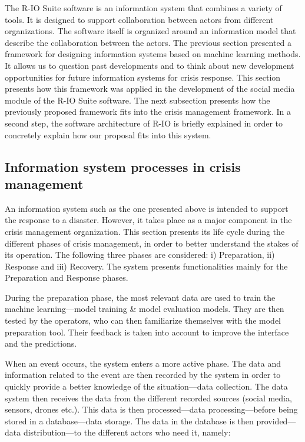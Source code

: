 The R-IO Suite software is an information system that combines a variety of tools.
It is designed to support collaboration between actors from different organizations.
The software itself is organized around an information model that describe the collaboration between the actors.
The previous section presented a framework for designing information systems based on machine learning methods.
It allows us to question past developments and to think about new development opportunities for future information systems for crisis response.
This section presents how this framework was applied in the development of the social media module of the R-IO Suite software.
The next subsection presents how the previously proposed framework fits into the crisis management framework.
In a second step, the software architecture of R-IO is briefly explained in order to concretely explain how our proposal fits into this system.

\subsection{Information system processes in crisis management}
An information system such as the one presented above is intended to support the response to a disaster.
However, it takes place as a major component in the crisis management organization.
This section presents its life cycle during the different phases of crisis management, in order to better understand the stakes of its operation.
The following three phases are considered: i) Preparation, ii) Response and iii) Recovery.
The system presents functionalities mainly for the Preparation and Response phases.

During the preparation phase, the most relevant data are used to train the machine learning—model training \& model evaluation models.
They are then tested by the operators, who can then familiarize themselves with the model preparation tool.
Their feedback is taken into account to improve the interface and the predictions.

When an event occurs, the system enters a more active phase.
The data and information related to the event are then recorded by the system in order to quickly provide a better knowledge of the situation—data collection.
The data system then receives the data from the different recorded sources (social media, sensors, drones etc.).
This data is then processed—data processing—before being stored in a database—data storage.
The data in the database is then provided—data distribution—to the different actors who need it, namely:

